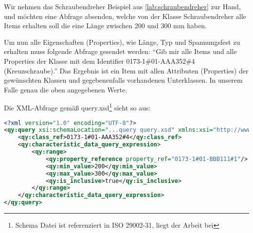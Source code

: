 Wir nehmen das Schraubendreher Beispiel aus \autoref{lab:schraubendreher} zur Hand, und möchten eine Abfrage absenden, welche von der Klasse Schraubendreher alle Items erhalten soll die eine Länge zwischen 200 und 300 mm haben. 

Um nun alle Eigenschaften (Properties), wie Länge, Typ und Spannungsfest zu erhalten muss folgende Abfrage gesendet werden: 
\enquote{Gib mir alle Items und alle Properties der Klasse mit dem Identifier 0173-1\#01-AAA352\#4 (Kreuzschraube).}
Das Ergebnis ist ein Item mit allen Attributen (Properties) der gewünschten Klassen und gegebenenfalls vorhandenen Unterklassen. In unserem Falle genau die oben angegebenen Werte.

Die XML-Abfrage gemäß query.xsd\footnote{Schema Datei ist referenziert in ISO 29002-31, liegt der Arbeit bei} sieht so aus:

\begin{lstlisting}[caption=Query Beispiel - Daten mit Suchausdruck abfragen, language=XML, label=UseCaseDatenabfragen]
<?xml version="1.0" encoding="UTF-8"?>
<qy:query xsi:schemaLocation="...query query.xsd" xmlns:xsi="http://www.w3.org/2001/XMLSchema-instance" xmlns:cat="...catalogue" xmlns:val="...value" xmlns:qy="...query" xmlns:bas="...basic">
	<qy:class_ref>0173-1#01-AAA352#4</qy:class_ref>
	<qy:characteristic_data_query_expression>
		<qy:range>
			<qy:property_reference property_ref="0173-1#01-BBB111#1"/>
			<qy:min_value>200</qy:min_value>
			<qy:max_value>300</qy:max_value>
			<qy:is_inclusive>true</qy:is_inclusive>
		</qy:range>
	</qy:characteristic_data_query_expression>
</qy:query>
\end{lstlisting}



